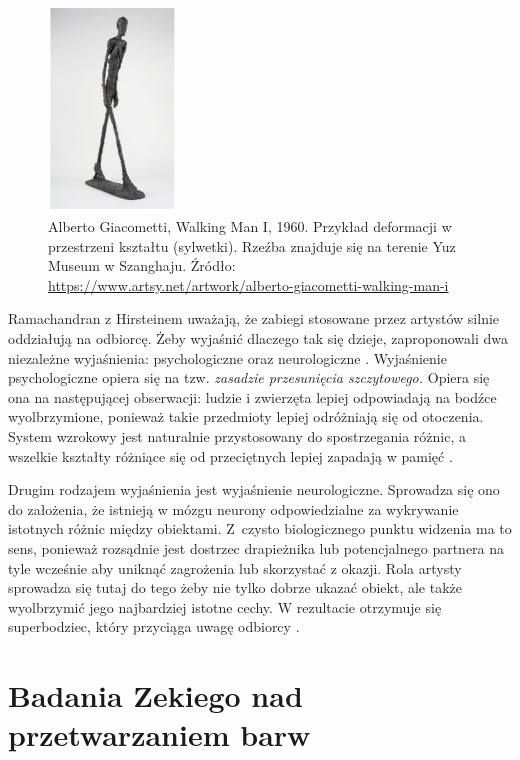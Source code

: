 \documentclass[licencjacka]{kdypl}
\begin{document}
\begin{figure}[hbt]
\includegraphics[width= 0.3\textwidth]{man}
\centering
\caption{Alberto Giacometti, Walking Man I, 1960. Przykład deformacji w przestrzeni kształtu (sylwetki). Rzeźba znajduje się na terenie Yuz Museum w Szanghaju. Źródło: \url{https://www.artsy.net/artwork/alberto-giacometti-walking-man-i}}
\end{figure}
\clearpage
Ramachandran z Hirsteinem uważają, że zabiegi stosowane przez artystów silnie oddziałują na odbiorcę. Żeby wyjaśnić dlaczego tak się dzieje, zaproponowali dwa niezależne wyjaśnienia: psychologiczne oraz neurologiczne \citep[s. 334-335]{Rama}. Wyjaśnienie psychologiczne opiera się na tzw. \textit{zasadzie przesunięcia szczytowego.} Opiera się ona na następującej obserwacji: ludzie i zwierzęta lepiej odpowiadają na bodźce wyolbrzymione, ponieważ takie przedmioty lepiej odróżniają się od otoczenia. System wzrokowy jest naturalnie przystosowany do spostrzegania różnic, a wszelkie kształty różniące się od przeciętnych lepiej zapadają w pamięć \cite[s. 334]{Rama}.

Drugim rodzajem wyjaśnienia jest wyjaśnienie neurologiczne. Sprowadza się ono do założenia, że istnieją w mózgu neurony odpowiedzialne za wykrywanie istotnych różnic między obiektami. Z~czysto biologicznego punktu widzenia ma to sens, ponieważ rozsądnie jest dostrzec drapieżnika lub potencjalnego partnera na tyle wcześnie aby uniknąć zagrożenia lub skorzystać z okazji. Rola artysty sprowadza się tutaj do tego żeby nie tylko dobrze ukazać obiekt, ale także wyolbrzymić jego najbardziej istotne cechy. W rezultacie otrzymuje się superbodziec, który przyciąga uwagę odbiorcy \citep[s. 335]{Rama}.




\section{Badania Zekiego nad przetwarzaniem barw}
\end{document}
